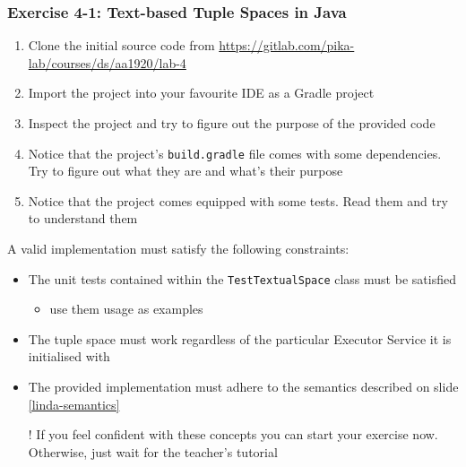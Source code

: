 \documentclass[presentation]{beamer}\mode<presentation>{\usetheme{AMSCesenaPurpleAndGold}}
\begin{document}
\begin{frame}[allowframebreaks]
\frametitle{Exercise 4-1: Text-based Tuple Spaces in Java}

\begin{enumerate}
	\item Clone the initial source code from \url{https://gitlab.com/pika-lab/courses/ds/aa1920/lab-4}
	
	\item Import the project into your favourite IDE as a Gradle project
	
	\item Inspect the project and try to figure out the purpose of the provided code
	
	\item Notice that the project's \texttt{build.gradle} file comes with some dependencies.
	Try to figure out what they are and what's their purpose
	
	\item Notice that the project comes equipped with some tests. 
	Read them and try to understand them
\end{enumerate}



\framebreak

A valid implementation must satisfy the following constraints:
%
\begin{itemize}
	
	\item The \alert{unit tests} contained within the \alert{\texttt{TestTextualSpace}} class must be satisfied
	\begin{itemize}
		\item use them usage as examples
	\end{itemize}
	
	\item The tuple space must work regardless of the particular Executor Service it is initialised with
	
	\item The provided implementation must adhere to the \alert{\linda{} semantics} described on slide \ref{linda-semantics}
	
	\vspace{.3 cm}
	
	\item[!] If you feel confident with these concepts you can start your exercise now. 
	Otherwise, just wait for the teacher's tutorial
\end{itemize}
\end{frame}
\end{document}
